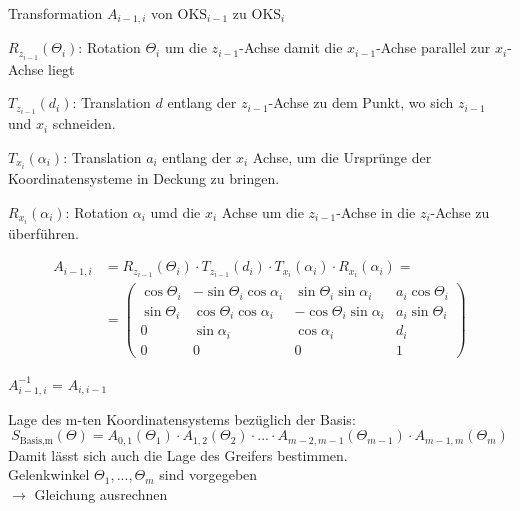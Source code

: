 Transformation $A_{i-1,i}$ von $\text{OKS}_{i-1}$ zu $\text{OKS}_i$
\begin{compactenum}
    \item $R_{z_{i-1}}(\Theta_i)$: Rotation $\Theta_{i}$ um die $z_{i-1}$-Achse damit die $x_{i-1}$-Achse parallel zur
    $x_{i}$-Achse liegt
    \item $T_{z_{i-1}}(d_i)$: Translation $d$ entlang der $z_{i-1}$-Achse zu dem Punkt, wo sich $z_{i-1}$ und $x_{i}$
    schneiden.
    \item $T_{x_i}(\alpha_i)$: Translation $a_i$ entlang der $x_i$ Achse, um die Ursprünge der Koordinatensysteme in
    Deckung zu bringen.
    \item $R_{x_i}(\alpha_i)$: Rotation $\alpha_{i}$ umd die $x_{i}$ Achse um die $z_{i-1}$-Achse in die
    $z_{i}$-Achse zu überführen.
\end{compactenum}
\begin{align}
    A_{i-1,i} &= R_{z_{i-1}}(\Theta_i) \cdot T_{z_{i-1}}(d_i) \cdot T_{x_i}(\alpha_i) \cdot R_{x_i}(\alpha_i) = \\
    &= \begin{pmatrix} \cos\Theta_i&-\sin\Theta_i\cos\alpha_i&\sin\Theta_i\sin\alpha_i&a_i\cos\Theta_i \\ \sin\Theta_i&\cos\Theta_i\cos\alpha_i &-\cos\Theta_i\sin\alpha_i &a_i\sin\Theta_i \\ 0&\sin\alpha_i&\cos\alpha_i&d_i \\0&0&0&1 \end{pmatrix}
\end{align}

$A^{-1}_{i-1,i}$ = $A_{i,i-1}$

Lage des m-ten Koordinatensystems bezüglich der Basis:
\begin{displaymath}
     S_\text{Basis,m}(\Theta) = A_{0,1}(\Theta_1) \cdot A_{1,2}(\Theta_2) \cdot ... \cdot
     A_{m-2,m-1}(\Theta_{m-1}) \cdot A_{m-1,m}(\Theta_m)
\end{displaymath}
Damit lässt sich auch die Lage des Greifers bestimmen. \\
Gelenkwinkel $\Theta_1, ... ,\Theta_m$ sind vorgegeben \\
$\rightarrow$ Gleichung ausrechnen

